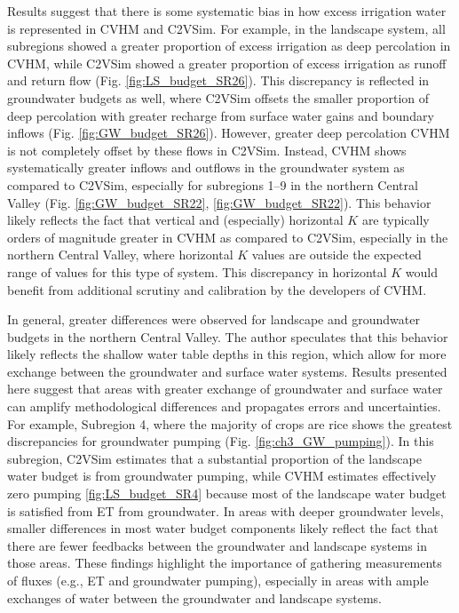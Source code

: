 Results suggest that there is some systematic bias in how excess irrigation water is represented in CVHM and C2VSim. For example, in the landscape system, all subregions showed a greater proportion of excess irrigation as deep percolation in CVHM, while C2VSim showed a greater proportion of excess irrigation as runoff and return flow (Fig. \ref{fig:LS_budget_SR26}). This discrepancy is reflected in groundwater budgets as well, where C2VSim offsets the smaller proportion of deep percolation with greater recharge from surface water gains and boundary inflows (Fig. \ref{fig:GW_budget_SR26}). However, greater deep percolation CVHM is not completely offset by these flows in C2VSim. Instead, CVHM shows systematically greater inflows and outflows in the groundwater system as compared to C2VSim, especially for subregions 1--9 in the northern Central Valley (Fig. \ref{fig:GW_budget_SR22}, \ref{fig:GW_budget_SR22}). This behavior likely reflects the fact that vertical and (especially) horizontal $K$ are typically orders of magnitude greater in CVHM as compared to C2VSim, especially in the northern Central Valley, where horizontal $K$ values are outside the expected range of values for this type of system. This discrepancy in horizontal $K$ would benefit from additional scrutiny and calibration by the developers of CVHM. 

In general, greater differences were observed for landscape and groundwater budgets in the northern Central Valley. The author speculates that this behavior likely reflects the shallow water table depths in this region, which allow for more exchange between the groundwater and surface water systems. Results presented here suggest that areas with greater exchange of groundwater and surface water can amplify methodological differences and propagates errors and uncertainties. For example, Subregion 4, where the majority of crops are rice \citep{faunt2009groundwater} shows the greatest discrepancies for groundwater pumping (Fig. \ref{fig:ch3_GW_pumping}). In this subregion, C2VSim estimates that a substantial proportion of the landscape water budget is from groundwater pumping, while CVHM estimates effectively zero pumping \ref{fig:LS_budget_SR4} because most of the landscape water budget is satisfied from ET from groundwater. In areas with deeper groundwater levels, smaller differences in most water budget components likely reflect the fact that there are fewer feedbacks between the groundwater and landscape systems in those areas. These findings highlight the importance of gathering measurements of fluxes (e.g., ET and groundwater pumping), especially in areas with ample exchanges of water between the groundwater and landscape systems.

